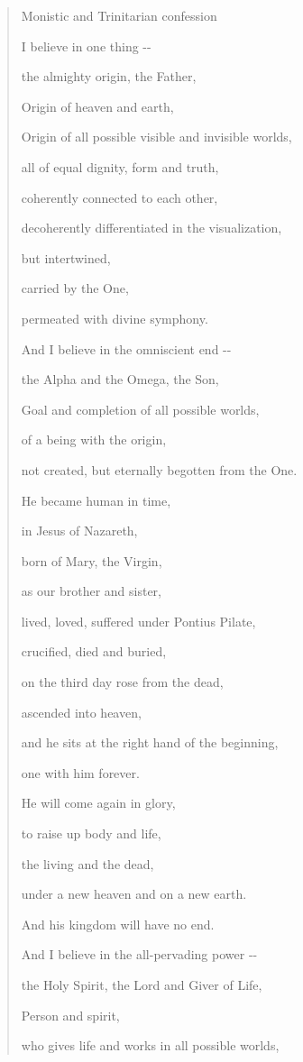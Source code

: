 \documentclass[
  ngerman,
]{article}
\begin{document}
\begin{quote}
Monistic and Trinitarian confession

I believe in one thing -\/-

the almighty origin, the Father,

Origin of heaven and earth,

Origin of all possible visible and invisible worlds,

all of equal dignity, form and truth,

coherently connected to each other,

decoherently differentiated in the visualization,

but intertwined,

carried by the One,

permeated with divine symphony.

And I believe in the omniscient end -\/-

the Alpha and the Omega, the Son,

Goal and completion of all possible worlds,

of a being with the origin,

not created, but eternally begotten from the One.

He became human in time,

in Jesus of Nazareth,

born of Mary, the Virgin,

as our brother and sister,

lived, loved, suffered under Pontius Pilate,

crucified, died and buried,

on the third day rose from the dead,

ascended into heaven,

and he sits at the right hand of the beginning,

one with him forever.

He will come again in glory,

to raise up body and life,

the living and the dead,

under a new heaven and on a new earth.

And his kingdom will have no end.

And I believe in the all-pervading power -\/-

the Holy Spirit, the Lord and Giver of Life,

Person and spirit,

who gives life and works in all possible worlds,


\end{quote}
\end{document}
